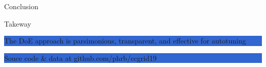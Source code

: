 \documentclass[10pt, compress, aspectratio=169, xcolor={table,usenames,dvipsnames}]{beamer}
\begin{document}
\begin{frame}[label={sec:org9d75a62}]{Conclusion}
\begin{block}{Takeway}
\vspace{.2cm}

\begin{center}
\colorbox{Highlight}{\parbox[c]{0.8\textwidth}{\centering The   \alert{DoE   approach}   is
    \alert{parsimonious},   \alert{transparent},   and   \alert{effective}   for
    \alert{autotuning}}}
\end{center}

\begin{center}
\colorbox{Highlight}{\parbox[c]{0.54\textwidth}{\centering \alert{Souce code \& data} at \alert{github.com/phrb/ccgrid19}}}
\end{center}
\end{block}
\end{frame}

\maketitle
\end{document}
